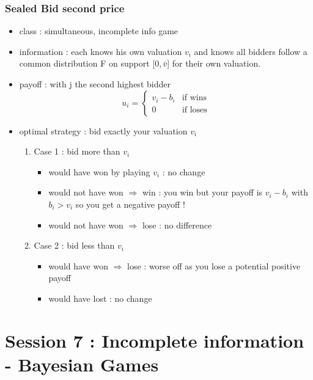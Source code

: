 \documentclass{article}
\begin{document}
\subsubsection{Sealed Bid second price }
\begin{itemize}
    \item class : simultaneous, incomplete info game 
    \item information : each knows his own valuation $v_i$ and knows all bidders follow a common distribution F on support [$0,\bar{v}$] for their own valuation. 
    \item payoff : with j the second highest bidder 
\begin{equation}  
    u_i =   
    \begin{cases}  
        v_i - b_i & \text{if wins} \\  
        0 & \text{if loses}  
    \end{cases}  
\end{equation} 
    \item optimal strategy : bid exactly your valuation $v_i$ 
    \begin{Proof}
        \begin{enumerate}
            \item Case 1 : bid more than $v_i$
            \begin{itemize}
                \item would have won by playing $v_i$ : no change
                \item would not have won $\Longrightarrow$ win : you win but your payoff is $v_i-b_i$ with $b_i>v_i$ so you get a negative payoff ! 
                \item would not have won $\Longrightarrow$ lose : no difference
            \end{itemize}
            \item Case 2 : bid less than $v_i$
            \begin{itemize}
                \item would have won $\Longrightarrow$ lose : worse off as you lose a potential positive payoff
                \item would have lost : no change
            \end{itemize}
        \end{enumerate}
    \end{Proof}
\end{itemize}

\section{Session 7 : Incomplete information - Bayesian Games}
\end{document}
